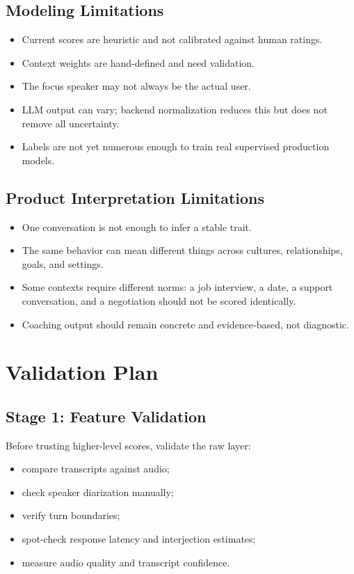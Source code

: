 \documentclass[11pt]{article}
\begin{document}
\subsection{Modeling Limitations}

\begin{itemize}[leftmargin=*]
  \item Current scores are heuristic and not calibrated against human ratings.
  \item Context weights are hand-defined and need validation.
  \item The focus speaker may not always be the actual user.
  \item LLM output can vary; backend normalization reduces this but does not remove all uncertainty.
  \item Labels are not yet numerous enough to train real supervised production models.
\end{itemize}

\subsection{Product Interpretation Limitations}

\begin{itemize}[leftmargin=*]
  \item One conversation is not enough to infer a stable trait.
  \item The same behavior can mean different things across cultures, relationships, goals, and settings.
  \item Some contexts require different norms: a job interview, a date, a support conversation, and a negotiation should not be scored identically.
  \item Coaching output should remain concrete and evidence-based, not diagnostic.
\end{itemize}

\section{Validation Plan}

\subsection{Stage 1: Feature Validation}

Before trusting higher-level scores, validate the raw layer:

\begin{itemize}[leftmargin=*]
  \item compare transcripts against audio;
  \item check speaker diarization manually;
  \item verify turn boundaries;
  \item spot-check response latency and interjection estimates;
  \item measure audio quality and transcript confidence.
\end{itemize}
\end{document}
